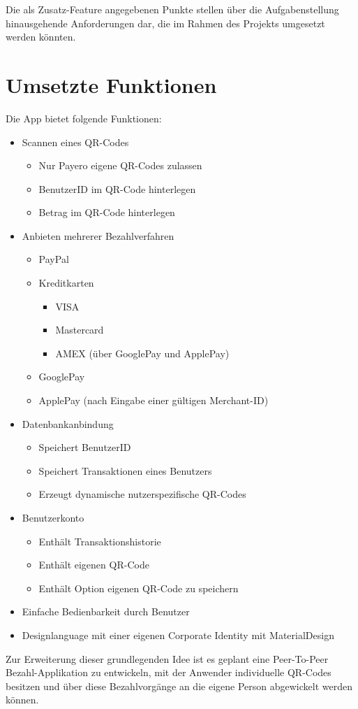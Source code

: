 Die als Zusatz-Feature angegebenen Punkte stellen über die Aufgabenstellung hinausgehende Anforderungen dar, die im Rahmen des Projekts umgesetzt werden könnten.


\section{Umsetzte Funktionen}

Die App bietet folgende Funktionen:

\begin{itemize}
    \item Scannen eines QR-Codes
    \begin{itemize}
        \item Nur Payero eigene QR-Codes zulassen
        \item BenutzerID im QR-Code hinterlegen
        \item Betrag im QR-Code hinterlegen
    \end{itemize}
    \item Anbieten mehrerer Bezahlverfahren
    \begin{itemize}
        \item PayPal
        \item Kreditkarten
        \begin{itemize}
            \item VISA
            \item Mastercard
            \item AMEX (über GooglePay und ApplePay)
        \end{itemize}
        \item GooglePay
        \item ApplePay (nach Eingabe einer gültigen Merchant-ID)
    \end{itemize}
    \item Datenbankanbindung
    \begin{itemize}
        \item Speichert BenutzerID
        \item Speichert Transaktionen eines Benutzers
        \item Erzeugt dynamische nutzerspezifische QR-Codes
    \end{itemize}
    \item Benutzerkonto
    \begin{itemize}
        \item Enthält Transaktionshistorie
        \item Enthält eigenen QR-Code
        \item Enthält Option eigenen QR-Code zu speichern
    \end{itemize}
    \item Einfache Bedienbarkeit durch Benutzer
    \item Designlanguage mit einer eigenen Corporate Identity mit MaterialDesign
\end{itemize}

Zur Erweiterung dieser grundlegenden Idee ist es geplant eine Peer-To-Peer Bezahl-Applikation zu entwickeln, mit der Anwender individuelle QR-Codes besitzen und über diese Bezahlvorgänge an die eigene Person abgewickelt werden können.